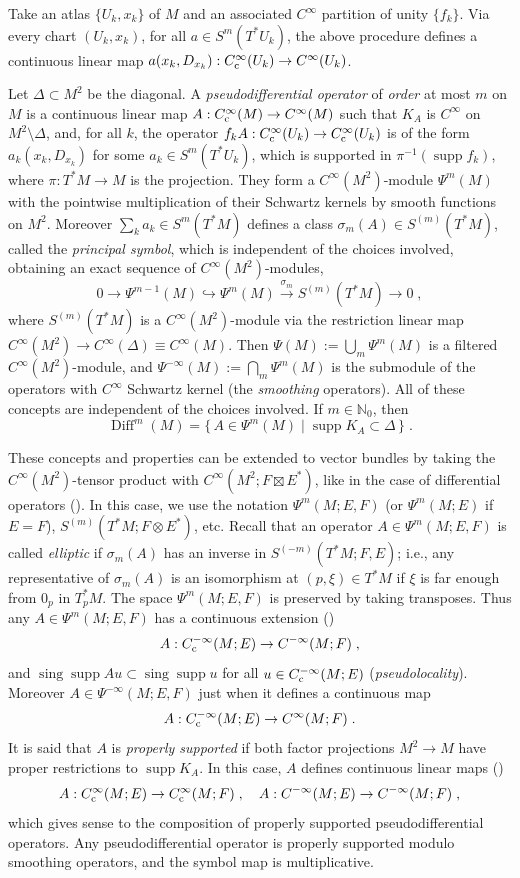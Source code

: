 \documentclass{memo-l}
\theoremstyle{plain}
\theoremstyle{definition}
\theoremstyle{remark}
\newcommand{\N}{\mathbb{N}}
\newcommand{\supp}{\operatorname{supp}}
\newcommand{\Diff}{\operatorname{Diff}}
\newcommand{\sing}{\operatorname{sing}}
\newcommand{\co}{{\text{\rm c}}}
\newcommand{\Cinftyc}{C^\infty_{\text{\rm c}}}
\numberwithin{section}{chapter}
\numberwithin{equation}{section}%
\begin{document}
Take an atlas $\{U_k,x_k\}$ of $M$ and an associated $C^\infty$ partition of unity $\{f_k\}$. Via every chart $(U_k,x_k)$, for all $a\in S^m(T^*U_k)$, the above procedure defines a continuous linear map $a(x_k,D_{x_k}):\Cinftyc(U_k)\to C^\infty(U_k)$. 

Let $\Delta\subset M^2$ be the diagonal. A \emph{pseudodifferential operator} of \emph{order} at most $m$ on $M$ is a continuous linear map $A:\Cinftyc(M)\to C^\infty(M)$ such that $K_A$ is $C^\infty$ on $M^2\setminus\Delta$, and, for all $k$, the operator $f_kA:\Cinftyc(U_k)\to\Cinftyc(U_k)$ is of the form $a_k(x_k,D_{x_k})$ for some $a_k\in S^m(T^*U_k)$, which is supported in $\pi^{-1}(\supp f_k)$, where $\pi:T^*M\to M$ is the projection. They form a $C^\infty(M^2)$-module $\Psi^m(M)$ with the pointwise multiplication of their Schwartz kernels by smooth functions on $M^2$. Moreover $\sum_ka_k\in S^m(T^*M)$ defines a class $\sigma_m(A)\in S^{(m)}(T^*M)$, called the \emph{principal symbol}, which is independent of the choices involved, obtaining an exact sequence of $C^\infty(M^2)$-modules,
\[
0\to\Psi^{m-1}(M)\hookrightarrow\Psi^m(M) \xrightarrow{\sigma_m} S^{(m)}(T^*M)\to0\;,
\]
where $S^{(m)}(T^*M)$ is a $C^\infty(M^2)$-module via the restriction linear map $C^\infty(M^2)\to C^\infty(\Delta)\equiv C^\infty(M)$. Then $\Psi(M):=\bigcup_m\Psi^m(M)$ is a filtered $C^\infty(M^2)$-module, and $\Psi^{-\infty}(M):=\bigcap_m\Psi^m(M)$ is the submodule of the operators with $C^\infty$ Schwartz kernel (the \emph{smoothing} operators). All of these concepts are independent of the choices involved. If $m\in\N_0$, then
\[
\Diff^m(M)=\{\,A\in\Psi^m(M)\mid\supp K_A\subset\Delta\,\}\;.
\]

These concepts and properties can be extended to vector bundles by taking the $C^\infty(M^2)$-tensor product with $C^\infty(M^2;F\boxtimes E^*)$, like in the case of differential operators (). In this case, we use the notation $\Psi^m(M;E,F)$  (or $\Psi^m(M;E)$ if $E=F$),  $S^{(m)}(T^*M;F\otimes E^*)$, etc.  Recall that an operator $A\in\Psi^m(M;E,F)$ is called \emph{elliptic} if $\sigma_m(A)$ has an inverse in $S^{(-m)}(T^*M;F,E)$; i.e., any representative of $\sigma_m(A)$ is an isomorphism at $(p,\xi)\in T^*M$ if $\xi$ is far enough from $0_p$ in $T^*_pM$. The space $\Psi^m(M;E,F)$ is preserved by taking transposes. Thus any $A\in\Psi^m(M;E,F)$ has a continuous extension ()
\[
A:C^{-\infty}_\co(M;E)\to C^{-\infty}(M;F)\;,
\]
and $\sing\supp Au\subset\sing\supp u$ for all $u\in C^{-\infty}_\co(M;E)$ (\emph{pseudolocality}). Moreover $A\in\Psi^{-\infty}(M;E,F)$ just when it defines a continuous map
\[
A:C^{-\infty}_\co(M;E)\to C^\infty(M;F)\;.
\]
It is said that $A$ is \emph{properly supported} if both factor projections $M^2\to M$ have proper restrictions to $\supp K_A$. In this case, $A$ defines continuous linear maps ()
\[
A:\Cinftyc(M;E)\to\Cinftyc(M;F)\;,\quad A:C^{-\infty}(M;E)\to C^{-\infty}(M;F)\;,
\]
which gives sense to the composition of properly supported pseudodifferential operators. Any pseudodifferential operator is properly supported modulo smoothing operators, and the symbol map is multiplicative. 
\end{document}
